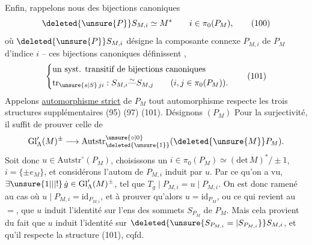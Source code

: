 Enfin, rappelons nous des bijections canoniques
\[
\deleted{\unsure{P}}S_{M,i}\simeq M^*\qquad i\in\pi_0(P_M),\tag*{(100)}
\]
où $\deleted{\unsure{P}}S_{M,i}$ désigne la  composante connexe $P_{M,i}$ de $P_M$ d'indice $i$ -- ces bijections canoniques définissent ,
\[
\left\{\begin{aligned}
&\text{un syst. transitif de bijections canoniques}\\
&\mathrm{tr}_{\unsure{s|S}\,ji}:S_{M,i}\overset{\sim}{\text{---}} S_{M,j}
\qquad(i,j\in\pi_0(P_M)).
\end{aligned}\right.\tag*{(101)}
\]
Appelons \uline{automorphisme strict} de $P_M$ tout automorphisme  respecte les trois structures supplémentaires (95) (97) (101).
Désignons  $(P_M)$
Pour la surjectivité, il suffit de prouver celle de
\[
\mathrm{Gl}'_\Lambda(M)^\pm\longrightarrow\mathrm{Autstr}_{\deleted{\unsure{1}}}^{\unsure{\circ|0}}(\deleted{\unsure{M}}P_M).
\]
Soit donc $u\in\mathrm{Autstr}^{\circ}(P_M)$, choisissons un  $i\in\pi_0(P_M)\simeq(\mathrm{det}\,M)^*/\pm1$, $i=\{\pm e_M\}$, et considérons l'autom de $P_{M,i}$ induit par $u$. Par ce qu'on a vu, $\exists\unsure{1|\vert|!}\,\dot g\in\mathrm{Gl}'_\Lambda(M)^\pm$, tel que $T_{\dot g}\mid P_{M,i}=u\mid P_{M,i}$. On est donc ramené au cas où  $u\mid P_{M,i}=\mathrm{id}_{P_{M,i}}$, et à prouver qu'alors $u=\mathrm{id}_{P_M}$, ou ce qui revient au $=$, que $u$ induit l'identité sur  l'ens des sommets $S_{P_M}$ de $P_M$. Mais cela provient du fait que $u$ induit l'identité sur $\deleted{\unsure{S_{P_{M,i}}=|S_{P_{M,i}}}}S_{M,i}$, et qu'il respecte la  structure (101), cqfd.

